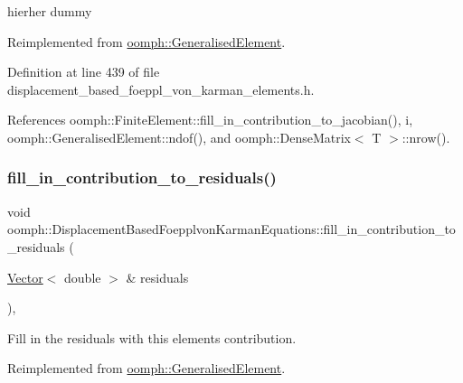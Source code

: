 hierher dummy 



Reimplemented from \hyperlink{classoomph_1_1GeneralisedElement_a2b6294a730647cf865da94f2531466f8}{oomph\+::\+Generalised\+Element}.



Definition at line 439 of file displacement\+\_\+based\+\_\+foeppl\+\_\+von\+\_\+karman\+\_\+elements.\+h.



References oomph\+::\+Finite\+Element\+::fill\+\_\+in\+\_\+contribution\+\_\+to\+\_\+jacobian(), i, oomph\+::\+Generalised\+Element\+::ndof(), and oomph\+::\+Dense\+Matrix$<$ T $>$\+::nrow().

\mbox{\label{classoomph_1_1DisplacementBasedFoepplvonKarmanEquations_ae5b7e25d861df6134d1ea4457e6e1880}} 
\subsubsection{\texorpdfstring{fill\+\_\+in\+\_\+contribution\+\_\+to\+\_\+residuals()}{fill\_in\_contribution\_to\_residuals()}}
{\footnotesize\ttfamily void oomph\+::\+Displacement\+Based\+Foepplvon\+Karman\+Equations\+::fill\+\_\+in\+\_\+contribution\+\_\+to\+\_\+residuals (\begin{DoxyParamCaption}\item[{\hyperlink{classoomph_1_1Vector}{Vector}$<$ double $>$ \&}]{residuals }\end{DoxyParamCaption})\hspace{0.3cm}{\ttfamily [inline]}, {\ttfamily [virtual]}}



Fill in the residuals with this element\textquotesingle{}s contribution. 



Reimplemented from \hyperlink{classoomph_1_1GeneralisedElement_a310c97f515e8504a48179c0e72c550d7}{oomph\+::\+Generalised\+Element}.



